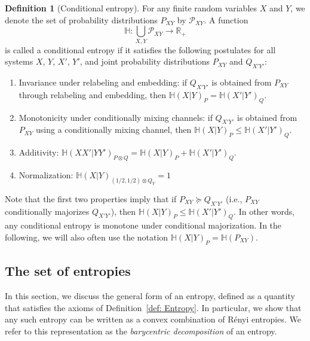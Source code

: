 \documentclass[aps,pra,11pt,onecolumn,nofootinbib,tightenlines]{revtex4-2}
\theoremstyle{definition}
\newtheorem{definition}[theorem]{Definition}
\renewcommand{\H}{\mathbb{H}}
\newcommand{\mc}[1]{\mathcal{#1}}
\begin{document}
\begin{definition}[Conditional entropy]
\label{def: conditional entropy}
For any finite random variables $X$ and $Y$, we denote the set of probability distributions $P_{XY}$ by $\mc P_{XY}$. A function
\begin{equation}
\H : \bigcup_{X, Y} \mc P_{XY} \rightarrow \mathbb{R}_+
\label{eq:cond-ent-gen-def-1st}
\end{equation}
is called a conditional entropy if it satisfies the following postulates for all systems $X$, $Y$, $X'$, $Y'$, and joint probability distributions $P_{XY}$ and $Q_{X'Y'}$:
\begin{enumerate}
    \item Invariance under relabeling and embedding: if $Q_{X'Y'}$ is obtained from $P_{XY}$ through relabeling and embedding, then $\H(X|Y)_P=\H(X'|Y')_Q$. 
 \label{eq:QCE-2nd-postulate-iso}
    \item Monotonicity under conditionally mixing channels: if $Q_{X'Y'}$ is obtained from $P_{XY}$ using a conditionally mixing channel, then $\H(X|Y)_P\leq\H(X'|Y')_Q.$ 
\label{eq:QCE-1st-postulate-mono} 
    \item Additivity: $\H(XX'|YY')_{P \otimes Q} = \H(X|Y)_{P} + \H(X'|Y')_{Q}$.
  \label{eq:QCE-3rd-postulate-add}
    \item Normalization: $\H(X|Y)_{(1/2,1/2) \otimes Q_Y} = 1$
     \label{eq:QCE-4-postulate-normalization}
\end{enumerate}
\end{definition}
Note that the first two properties imply that if \(P_{XY} \succeq Q_{X'Y'}\) (i.e., \(P_{XY}\) conditionally majorizes \(Q_{X'Y'}\)), then \(\H(X|Y)_P \leq \H(X'|Y')_Q\). In other words, any conditional entropy is monotone under conditional majorization. In the following, we will 
also often use the notation $\H(X|Y)_P=\H(P_{XY})$.

\subsection{The set of entropies}
\label{sec: set of entropies}
In this section, we discuss the general form of an entropy, defined as a quantity that satisfies the axioms of Definition~\ref{def: Entropy}.
In particular, we show that any such entropy can be written as a convex combination of Rényi entropies. We refer to this representation as the \emph{barycentric decomposition} of an entropy.
\end{document}
